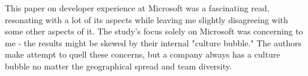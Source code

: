 \documentclass{article}
\begin{document}

    This paper on developer experience at Microsoft was a fascinating read, resonating with a lot of its aspects while leaving me slightly disagreeing with some other aspects of it. The study's focus solely on Microsoft was concerning to me - the results might be skewed by their internal "culture bubble." The authors make attempt to quell these concerns, but a company always has a culture bubble no matter the geographical spread and team diversity.
\end{document}
